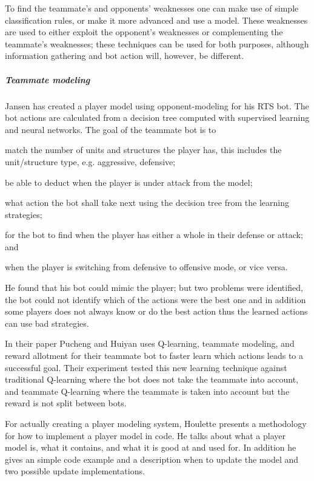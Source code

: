To find the teammate’s and opponents’ weaknesses one can make use of simple classification rules, or
make it more advanced and use a model. These weaknesses are used to either exploit the opponent's
weaknesses or complementing the teammate's weaknesses; these techniques can be used for both
purposes, although information gathering and bot action will, however, be different.

\subparagraph{Teammate modeling}
Jansen has created a player model using opponent-modeling for his
RTS bot\cite{jansen07}. The bot actions are calculated from a  decision tree computed with
supervised learning and neural networks. The goal of the teammate bot is to
\begin{inparaenum}[1\upshape)]
	\item match the number of units and structures the player has, this includes the unit/structure
	  type, e.g. aggressive, defensive;
	\item be able to deduct when the player is under attack from the model;
	\item what action the bot shall take next using the decision tree from the learning strategies;
	\item for the bot to find when the player has either a whole in their defense or attack; and
	\item when the player is switching from defensive to offensive mode, or vice versa.
\end{inparaenum}
He found that his bot could mimic the player; but two problems were identified, the bot could not
identify which of the actions were the best one and in addition some players does not always know or
do the best action thus the learned actions can use bad strategies.

In their paper\cite{pucheng11} Pucheng and Huiyan uses Q-learning, teammate modeling, and reward
allotment for their teammate bot to faster learn which actions leads to a successful goal. Their
experiment tested this new learning technique against traditional Q-learning where the bot does not
take the teammate into account, and teammate Q-learning where the teammate is taken into account but
the reward is not split between bots.

For actually creating a player modeling system, Houlette presents a methodology for how to implement
a player model in code\cite{houlette03}. He talks about what a player model is, what it contains,
and what it is good at and used for. In addition he gives an simple code example and a description
when to update the model and two possible update implementations.

